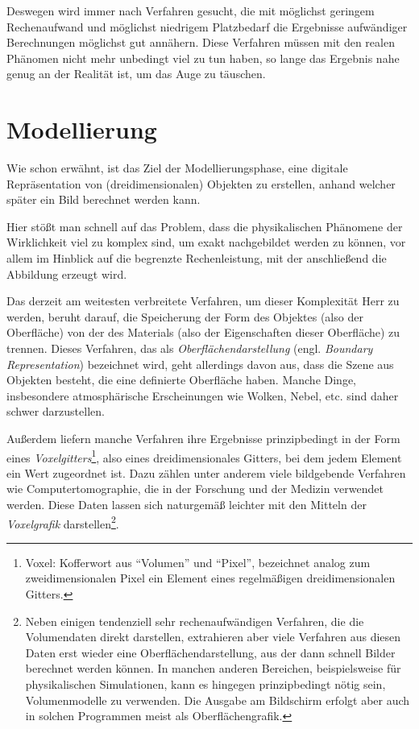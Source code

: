 Deswegen wird immer nach Verfahren gesucht, die mit möglichst geringem Rechenaufwand und möglichst niedrigem Platzbedarf die Ergebnisse aufwändiger Berechnungen möglichst gut annähern. Diese Verfahren müssen mit den realen Phänomen nicht mehr unbedingt viel zu tun haben, so lange das Ergebnis nahe genug an der Realität ist, um das Auge zu täuschen.

\section{Modellierung}
Wie schon erwähnt, ist das Ziel der Modellierungsphase, eine digitale Repräsentation von (dreidimensionalen) Objekten zu erstellen, anhand welcher später ein Bild berechnet werden kann.

Hier stößt man schnell auf das Problem, dass die physikalischen Phänomene der Wirklichkeit viel zu komplex sind, um exakt nachgebildet werden zu können, vor allem im Hinblick auf die begrenzte Rechenleistung, mit der anschließend die Abbildung erzeugt wird.

Das derzeit am weitesten verbreitete Verfahren, um dieser Komplexität Herr zu werden, beruht darauf, die Speicherung der Form des Objektes (also der Oberfläche) von der des Materials (also der Eigenschaften dieser Oberfläche) zu trennen. Dieses Verfahren, das als \emph{Oberflächendarstellung} (engl. \emph{Boundary Representation}) bezeichnet wird, geht allerdings davon aus, dass die Szene aus Objekten besteht, die eine definierte Oberfläche haben. Manche Dinge, insbesondere atmosphärische Erscheinungen wie Wolken, Nebel, etc. sind daher schwer darzustellen.

Außerdem liefern manche Verfahren ihre Ergebnisse prinzipbedingt in der Form eines \emph{Voxelgitters}\footnote{Voxel: Kofferwort aus \enquote{Volumen} und \enquote{Pixel}, bezeichnet analog zum zweidimensionalen Pixel ein Element eines regelmäßigen dreidimensionalen Gitters.}, also eines dreidimensionales Gitters, bei dem jedem Element ein Wert zugeordnet ist. Dazu zählen unter anderem viele bildgebende Verfahren wie Computertomographie, die in der Forschung und der Medizin verwendet werden. Diese Daten lassen sich naturgemäß leichter mit den Mitteln der \emph{Voxelgrafik} darstellen\footnote{Neben einigen tendenziell sehr rechenaufwändigen Verfahren, die die Volumendaten direkt darstellen, extrahieren aber viele Verfahren aus diesen Daten erst wieder eine Oberflächendarstellung, aus der dann schnell Bilder berechnet werden können.
In manchen anderen Bereichen, beispielsweise für physikalischen Simulationen, kann es hingegen prinzipbedingt nötig sein, Volumenmodelle zu verwenden. Die Ausgabe am Bildschirm erfolgt aber auch in solchen Programmen meist als Oberflächengrafik.}.

